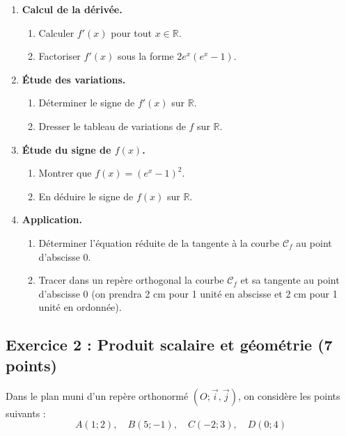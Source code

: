 \documentclass[a4paper,12pt]{article}
\begin{document}
\begin{enumerate}
\item \textbf{Calcul de la dérivée.}
\begin{enumerate}
\item Calculer $f'(x)$ pour tout $x \in \mathbb{R}$.
\item Factoriser $f'(x)$ sous la forme $2e^x (e^x - 1)$.
\end{enumerate}

\item \textbf{Étude des variations.}
\begin{enumerate}
\item Déterminer le signe de $f'(x)$ sur $\mathbb{R}$.
\item Dresser le tableau de variations de $f$ sur $\mathbb{R}$.
\end{enumerate}

\item \textbf{Étude du signe de $f(x)$.}
\begin{enumerate}
\item Montrer que $f(x) = (e^x - 1)^2$.
\item En déduire le signe de $f(x)$ sur $\mathbb{R}$.
\end{enumerate}

\item \textbf{Application.}
\begin{enumerate}
\item Déterminer l'équation réduite de la tangente à la courbe $\mathcal{C}_f$ au point d'abscisse $0$.
\item Tracer dans un repère orthogonal la courbe $\mathcal{C}_f$ et sa tangente au point d'abscisse $0$ (on prendra 2 cm pour 1 unité en abscisse et 2 cm pour 1 unité en ordonnée).
\end{enumerate}
\end{enumerate}

\newpage

\subsection*{Exercice 2 : Produit scalaire et géométrie (7 points)}

Dans le plan muni d'un repère orthonormé $(O; \vec{i}, \vec{j})$, on considère les points suivants :
\[
A(1; 2), \quad B(5; -1), \quad C(-2; 3), \quad D(0; 4)
\]
\end{document}
